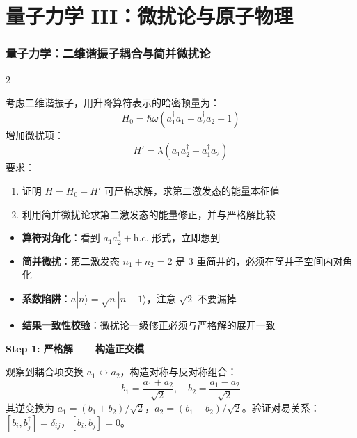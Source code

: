 \part{量子力学 III：微扰论与原子物理}\label{part:qm3}\setpartcolor{\value{part}}

\newpage
\section{量子力学：二维谐振子耦合与简并微扰论}

\begin{multicols}{2}

\begin{modelbox}[题目：二维谐振子的严格解与微扰论]
考虑二维谐振子，用升降算符表示的哈密顿量为：
\[
H_0 = \hbar\omega (a_1^\dagger a_1 + a_2^\dagger a_2 + 1)
\]
增加微扰项：
\[
H' = \lambda (a_1 a_2^\dagger + a_1^\dagger a_2)
\]
要求：
\begin{enumerate}[nosep]
    \item 证明 $H = H_0 + H'$ 可严格求解，求第二激发态的能量本征值
    \item 利用简并微扰论求第二激发态的能量修正，并与严格解比较
\end{enumerate}
\end{modelbox}

\begin{tipbox}[考点快速分析]
\begin{itemize}
    \item \textbf{算符对角化}：看到 $a_1 a_2^\dagger + \text{h.c.}$ 形式，立即想到
    \item \textbf{简并微扰}：第二激发态 $n_1+n_2=2$ 是 3 重简并的，必须在简并子空间内对角化
    \item \textbf{系数陷阱}：$a|n\rangle = \sqrt{n}|n-1\rangle$，注意 $\sqrt{2}$ 不要漏掉
    \item \textbf{结果一致性校验}：微扰论一级修正必须与严格解的展开一致
\end{itemize}
\end{tipbox}

\begin{derivationbox}[标准解题过程]
\textbf{Step 1: 严格解——构造正交模}

观察到耦合项交换 $a_1 \leftrightarrow a_2$，构造对称与反对称组合：
\[
b_1 = \frac{a_1 + a_2}{\sqrt{2}}, \quad b_2 = \frac{a_1 - a_2}{\sqrt{2}}
\]
其逆变换为 $a_1 = (b_1 + b_2)/\sqrt{2}$，$a_2 = (b_1 - b_2)/\sqrt{2}$。验证对易关系：$[b_i, b_j^\dagger] = \delta_{ij}$，$[b_i, b_j] = 0$。


\end{derivationbox}
\end{multicols}

